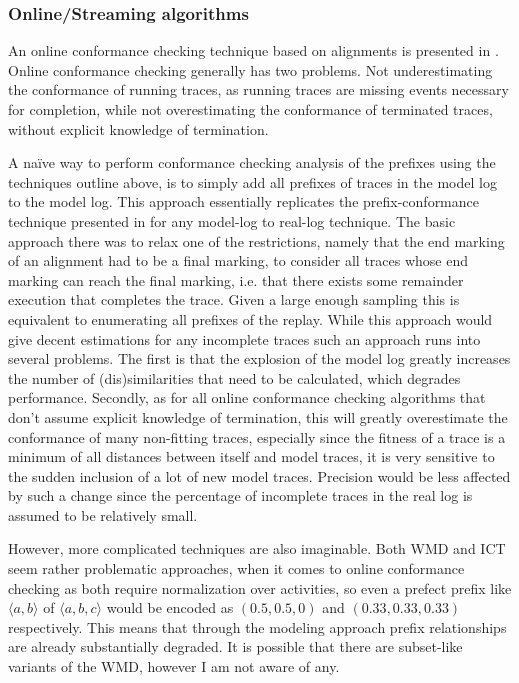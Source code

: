 \documentclass[runningheads]{template/llncs}
\begin{document}
\subsubsection{Online/Streaming algorithms}
An online conformance checking technique based on alignments is presented in \cite{ZBK*19}.
Online conformance checking generally has two problems. Not underestimating the conformance of running traces, as running traces are missing events necessary for completion, while not overestimating the conformance of terminated traces, without explicit knowledge of termination.

A naïve way to perform conformance checking analysis of the prefixes using the techniques outline above, is to simply add all prefixes of traces in the model log  to the model log.
This approach essentially replicates the prefix-conformance technique presented in \cite{ZBK*19} for any model-log to real-log technique.
The basic approach there was to relax one of the restrictions, namely that the end marking of an alignment had to be a final marking, to consider all traces whose end marking can reach the final marking, i.e. that there exists some remainder execution that completes the trace.
Given a large enough sampling this is equivalent to enumerating all prefixes of the replay.
While this approach would give decent estimations for any incomplete traces such an approach runs into several problems.
The first is that the explosion of the model log greatly increases the number of (dis)similarities that need to be calculated, which degrades performance.
Secondly, as for all online conformance checking algorithms that don't assume explicit knowledge of termination, this will greatly overestimate the conformance of many non-fitting traces, especially since the fitness of a trace is a minimum of all distances between itself and model traces, it is very sensitive to the sudden inclusion of a lot of new model traces.
Precision would be less affected by such a change since the percentage of incomplete traces in the real log is assumed to be relatively small.

However, more complicated techniques are also imaginable.
Both WMD and ICT seem rather problematic approaches, when it comes to online conformance checking as both require normalization over activities, so even a prefect prefix like $\langle a,b\rangle$ of $\langle a,b,c\rangle$ would be encoded as $(0.5,0.5,0)$ and $(0.33,0.33,0.33)$ respectively.
This means that through the modeling approach prefix relationships are already substantially degraded.
It is possible that there are subset-like variants of the WMD, however I am not aware of any.
\end{document}
